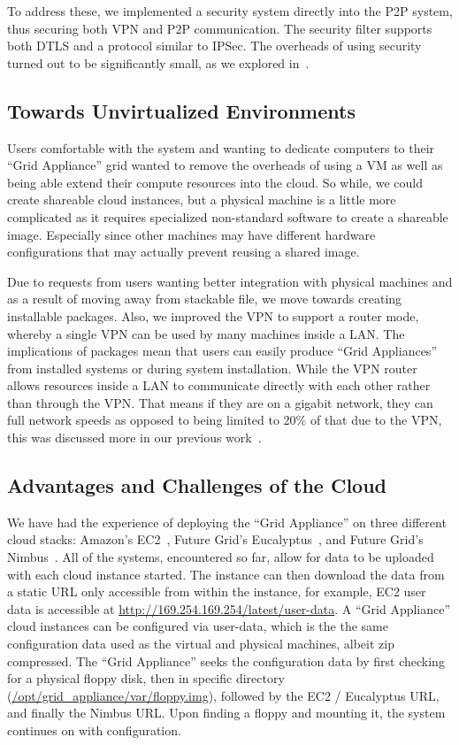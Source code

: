 \documentclass[conference]{IEEEtran}
\begin{document}
To address these, we implemented a security system directly into the P2P
system, thus securing both VPN and P2P communication.  The security filter
supports both DTLS and a protocol similar to IPSec.  The overheads of using
security turned out to be significantly small, as we explored
in~\cite{bootstrapping}.

\subsection{Towards Unvirtualized Environments}

Users comfortable with the system and wanting to dedicate computers to their
``Grid Appliance'' grid wanted to remove the overheads of using a VM as well as
being able extend their compute resources into the cloud.  So while, we could
create shareable cloud instances, but a physical machine is a little more
complicated as it requires specialized non-standard software to create a
shareable image.  Especially since other machines may have different hardware
configurations that may actually prevent reusing a shared image.

Due to requests from users wanting better integration with physical machines
and as a result of moving away from stackable file, we move towards creating
installable packages.  Also, we improved the VPN to support a router mode,
whereby a single VPN can be used by many machines inside a LAN.  The
implications of packages mean that users can easily produce ``Grid Appliances''
from installed systems or during system installation.  While the VPN router
allows resources inside a LAN to communicate directly with each other rather
than through the VPN.  That means if they are on a gigabit network, they can
full network speeds as opposed to being limited to 20\% of that due to the VPN,
this was discussed more in our previous work~\cite{sc09}.

\subsection{Advantages and Challenges of the Cloud}

We have had the experience of deploying the ``Grid Appliance'' on three
different cloud stacks:  Amazon's EC2~\cite{ec2}, Future Grid's
Eucalyptus~\cite{eucalyptus}, and Future Grid's Nimbus~\cite{nimbus}.  All of
the systems, encountered so far, allow for data to be uploaded with each cloud
instance started.  The instance can then download the data from a static URL
only accessible from within the instance, for example, EC2 user data is
accessible at \url{http://169.254.169.254/latest/user-data}. A ``Grid
Appliance'' cloud instances can be configured via user-data, which is the the
same configuration data used as the virtual and physical machines, albeit zip
compressed.  The ``Grid Appliance'' seeks the configuration data by first
checking for a physical floppy disk, then in specific directory
(\url{/opt/grid\_appliance/var/floppy.img}), followed by the EC2 / Eucalyptus
URL, and finally the Nimbus URL.  Upon finding a floppy and mounting it, the
system continues on with configuration.
\end{document}
